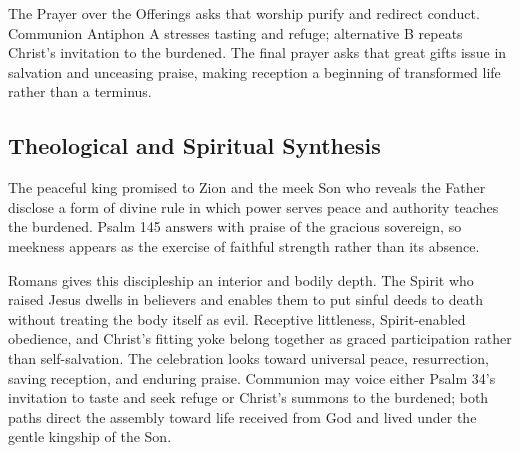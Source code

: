 \begin{deepstudy}
The Prayer over the Offerings asks that worship purify and redirect conduct. Communion Antiphon A stresses tasting and refuge; alternative B repeats Christ's invitation to the burdened. The final prayer asks that great gifts issue in salvation and unceasing praise, making reception a beginning of transformed life rather than a terminus.

\clearpage
\subsection*{Theological and Spiritual Synthesis}

The peaceful king promised to Zion and the meek Son who reveals the Father disclose a form of divine rule in which power serves peace and authority teaches the burdened. Psalm 145 answers with praise of the gracious sovereign, so meekness appears as the exercise of faithful strength rather than its absence.

Romans gives this discipleship an interior and bodily depth. The Spirit who raised Jesus dwells in believers and enables them to put sinful deeds to death without treating the body itself as evil. Receptive littleness, Spirit-enabled obedience, and Christ's fitting yoke belong together as graced participation rather than self-salvation.
The celebration looks toward universal peace, resurrection, saving reception, and enduring praise. Communion may voice either Psalm 34's invitation to taste and seek refuge or Christ's summons to the burdened; both paths direct the assembly toward life received from God and lived under the gentle kingship of the Son.


\end{deepstudy}

